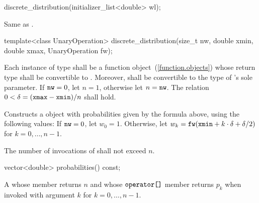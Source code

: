 %
\begin{itemdecl}
discrete_distribution(initializer_list<double> wl);
\end{itemdecl}

\begin{itemdescr}
\pnum\effects
 Same as .
\end{itemdescr}

\begin{itemdecl}
template<class UnaryOperation>
  discrete_distribution(size_t nw, double xmin, double xmax, UnaryOperation fw);
\end{itemdecl}

\begin{itemdescr}
\pnum\requires
 Each instance of type 
 shall be a function object~(\ref{function.objects})
 whose return type shall be convertible to .
 Moreover,
  shall be convertible
 to the type of 's sole parameter.
 If $ \texttt{nw} = 0 $, let $ n = 1 $, otherwise let $n = \texttt{nw}$.
 The relation
   $ 0 < \delta = (\texttt{xmax} - \texttt{xmin}) / n $
 shall hold.

\pnum\effects Constructs a  object
 with probabilities given by the formula above,
 using the following values:
 If $\texttt{nw} = 0$,
 let $ w_0 = 1 $.
 Otherwise,
 let $ w_k = \texttt{fw}(\texttt{xmin} + k \cdot \delta + \delta / 2) $
 for $ k = 0, \ldots, n\!-\!1 $.

\pnum\complexity
 The number of invocations of  shall not exceed $n$.
\end{itemdescr}

%
%
\begin{itemdecl}
vector<double> probabilities() const;
\end{itemdecl}

\begin{itemdescr}
\pnum\returns A 
 whose  member returns $n$
 and whose $ \texttt{operator[]} $ member returns $p_k$
 when invoked with argument $k$ for $k = 0, \ldots, n\!-\!1 $.
\end{itemdescr}



